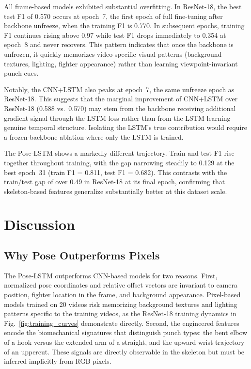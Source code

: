 \documentclass[conference]{IEEEtran}
\begin{document}
All frame-based models exhibited substantial overfitting. In ResNet-18, the
best test F1 of 0.570 occurs at epoch~7, the first epoch of full fine-tuning
after backbone unfreeze, when the training F1 is 0.770. In subsequent epochs,
training F1 continues rising above 0.97 while test F1 drops immediately to
0.354 at epoch~8 and never recovers. This pattern indicates that once the
backbone is unfrozen, it quickly memorizes video-specific visual patterns
(background textures, lighting, fighter appearance) rather than learning
viewpoint-invariant punch cues.

Notably, the CNN+LSTM also peaks at epoch~7, the same unfreeze epoch as
ResNet-18. This suggests that the marginal improvement of CNN+LSTM over
ResNet-18 (0.588 vs.\ 0.570) may stem from the backbone receiving additional
gradient signal through the LSTM loss rather than from the LSTM learning
genuine temporal structure. Isolating the LSTM's true contribution would
require a frozen-backbone ablation where only the LSTM is trained.

The Pose-LSTM shows a markedly different trajectory. Train and test F1 rise
together throughout training, with the gap narrowing steadily to 0.129 at the
best epoch~31 (train F1 = 0.811, test F1 = 0.682). This contrasts with the
train/test gap of over 0.49 in ResNet-18 at its final epoch, confirming that
skeleton-based features generalize substantially better at this dataset scale.

\section{Discussion}
\label{sec:discussion}

\subsection{Why Pose Outperforms Pixels}
The Pose-LSTM outperforms CNN-based models for two reasons. First, normalized
pose coordinates and relative offset vectors are invariant to camera position,
fighter location in the frame, and background appearance. Pixel-based models
trained on 20 videos risk memorizing background textures and lighting patterns
specific to the training videos, as the ResNet-18 training dynamics in
Fig.~\ref{fig:training_curves} demonstrate directly. Second, the engineered
features encode the biomechanical signatures that distinguish punch types: the
bent elbow of a hook versus the extended arm of a straight, and the upward
wrist trajectory of an uppercut. These signals are directly observable in the
skeleton but must be inferred implicitly from RGB pixels.
\end{document}
